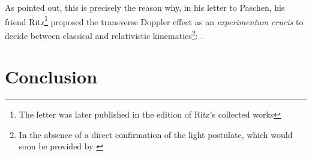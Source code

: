 \documentclass[submitted,12pt]{article}
\newcommand{\tDe}{transverse Doppler effect\xspace}
\begin{document}
%
As \Ehr pointed out, this is precisely the reason why, in his letter to Paschen, his friend Ritz\footnote{The letter was later published in the \citeyear{Ritz1911} edition of Ritz’s collected works} proposed the \tDe as an \textit{experimentum crucis} to decide between classical and relativistic kinematics\footnote{In the absence of a direct confirmation of the light postulate, which would soon be provided by \citet{Sitter1913}}:  \citep[319\me]{Ehrenfest1912}.

\section*{Conclusion}
\end{document}
